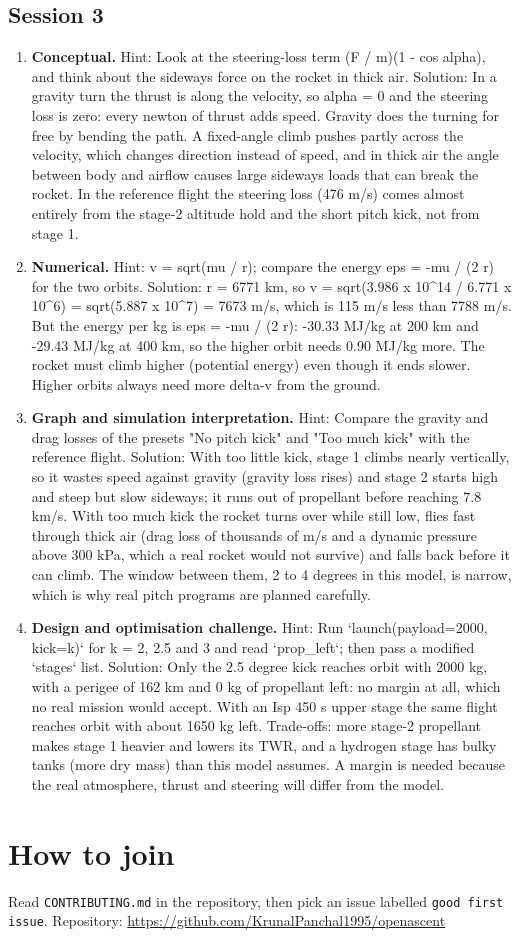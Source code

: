 \documentclass[11pt,a4paper]{article}
\begin{document}
\subsection*{Session 3}
\begin{enumerate}[nosep]
\item \textbf{Conceptual.} Hint: Look at the steering-loss term (F / m)(1 - cos alpha), and think about the sideways force on the rocket in thick air. Solution: In a gravity turn the thrust is along the velocity, so alpha = 0 and the steering loss is zero: every newton of thrust adds speed. Gravity does the turning for free by bending the path. A fixed-angle climb pushes partly across the velocity, which changes direction instead of speed, and in thick air the angle between body and airflow causes large sideways loads that can break the rocket. In the reference flight the steering loss (476 m/s) comes almost entirely from the stage-2 altitude hold and the short pitch kick, not from stage 1.
\item \textbf{Numerical.} Hint: v = sqrt(mu / r); compare the energy eps = -mu / (2 r) for the two orbits. Solution: r = 6771 km, so v = sqrt(3.986 x 10\textasciicircum{}14 / 6.771 x 10\textasciicircum{}6) = sqrt(5.887 x 10\textasciicircum{}7) = 7673 m/s, which is 115 m/s less than 7788 m/s. But the energy per kg is eps = -mu / (2 r): -30.33 MJ/kg at 200 km and -29.43 MJ/kg at 400 km, so the higher orbit needs 0.90 MJ/kg more. The rocket must climb higher (potential energy) even though it ends slower. Higher orbits always need more delta-v from the ground.
\item \textbf{Graph and simulation interpretation.} Hint: Compare the gravity and drag losses of the presets "No pitch kick" and "Too much kick" with the reference flight. Solution: With too little kick, stage 1 climbs nearly vertically, so it wastes speed against gravity (gravity loss rises) and stage 2 starts high and steep but slow sideways; it runs out of propellant before reaching 7.8 km/s. With too much kick the rocket turns over while still low, flies fast through thick air (drag loss of thousands of m/s and a dynamic pressure above 300 kPa, which a real rocket would not survive) and falls back before it can climb. The window between them, 2 to 4 degrees in this model, is narrow, which is why real pitch programs are planned carefully.
\item \textbf{Design and optimisation challenge.} Hint: Run `launch(payload=2000, kick=k)` for k = 2, 2.5 and 3 and read `prop\_left`; then pass a modified `stages` list. Solution: Only the 2.5 degree kick reaches orbit with 2000 kg, with a perigee of 162 km and 0 kg of propellant left: no margin at all, which no real mission would accept. With an Isp 450 s upper stage the same flight reaches orbit with about 1650 kg left. Trade-offs: more stage-2 propellant makes stage 1 heavier and lowers its TWR, and a hydrogen stage has bulky tanks (more dry mass) than this model assumes. A margin is needed because the real atmosphere, thrust and steering will differ from the model.
\end{enumerate}

\section{How to join}
Read \texttt{CONTRIBUTING.md} in the repository, then pick an issue labelled \texttt{good first issue}. Repository: \url{https://github.com/KrunalPanchal1995/openascent}
\end{document}
